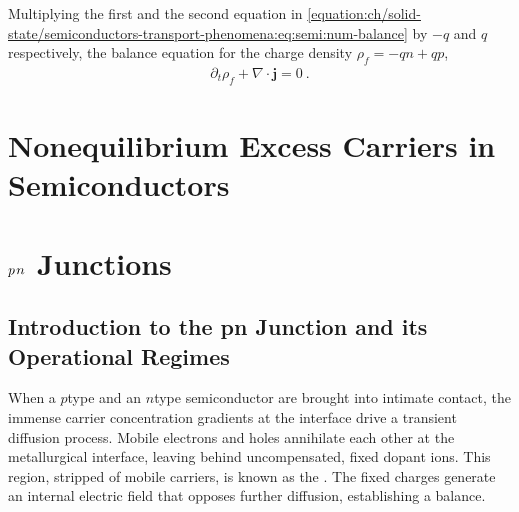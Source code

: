 \documentclass[letterpaper,10pt,english]{jupyterBook}
\begin{document}
\sphinxAtStartPar
Multiplying the first and the second equation in \eqref{equation:ch/solid-state/semiconductors-transport-phenomena:eq:semi:num-balance} by \(-q\) and \(q\) respectively, the balance equation for the  charge density \(\rho_f = - q n + q p\),
\begin{equation*}
\begin{split}\partial_t \rho_f + \nabla \cdot \mathbf{j} = 0 \ .\end{split}
\end{equation*}
\sphinxstepscope


\section{Non\sphinxhyphen{}equilibrium Excess Carriers in Semiconductors}
\label{\detokenize{ch/solid-state/semiconductors-non-equilibrium:non-equilibrium-excess-carriers-in-semiconductors}}\label{\detokenize{ch/solid-state/semiconductors-non-equilibrium:semiconductors-non-equilibrium}}\label{\detokenize{ch/solid-state/semiconductors-non-equilibrium::doc}}
\sphinxstepscope


\section{\protect\(p\protect\)\sphinxhyphen{}\protect\(n\protect\) Junctions}
\label{\detokenize{ch/solid-state/semiconductors-pn-junctions:p-n-junctions}}\label{\detokenize{ch/solid-state/semiconductors-pn-junctions:semiconductors-pn-junctions}}\label{\detokenize{ch/solid-state/semiconductors-pn-junctions::doc}}



\subsection{Introduction to the pn Junction and its Operational Regimes}
\label{\detokenize{ch/solid-state/semiconductors-pn-junctions:introduction-to-the-pn-junction-and-its-operational-regimes}}\label{\detokenize{ch/solid-state/semiconductors-pn-junctions:semiconductors-pn-junctions-regimes}}
\sphinxAtStartPar
When a \(p\)\sphinxhyphen{}type and an \(n\)\sphinxhyphen{}type semiconductor are brought into intimate contact, the immense carrier concentration gradients at the interface drive a transient diffusion process. Mobile electrons and holes annihilate each other at the metallurgical interface, leaving behind uncompensated, fixed dopant ions. This region, stripped of mobile carriers, is known as the . The fixed charges generate an internal electric field that opposes further diffusion, establishing a balance.
\end{document}
